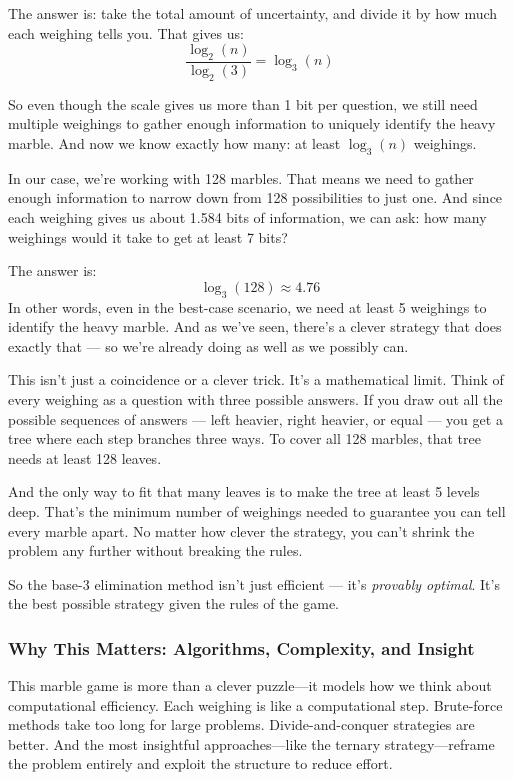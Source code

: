 The answer is: take the total amount of uncertainty, and divide it by how much each weighing tells you. That gives us:
\[
\frac{\log_2(n)}{\log_2(3)} = \log_3(n)
\]

So even though the scale gives us more than 1 bit per question, we still need multiple weighings to gather enough information to uniquely identify the heavy marble. And now we know exactly how many: at least \( \log_3(n) \) weighings.


In our case, we’re working with 128 marbles. That means we need to gather enough information to narrow down from 128 possibilities to just one. And since each weighing gives us about 1.584 bits of information, we can ask: how many weighings would it take to get at least 7 bits?

The answer is:
\[
\log_3(128) \approx 4.76
\]
In other words, even in the best-case scenario, we need at least 5 weighings to identify the heavy marble. And as we’ve seen, there’s a clever strategy that does exactly that — so we’re already doing as well as we possibly can.

This isn’t just a coincidence or a clever trick. It’s a mathematical limit. Think of every weighing as a question with three possible answers. If you draw out all the possible sequences of answers — left heavier, right heavier, or equal — you get a tree where each step branches three ways. To cover all 128 marbles, that tree needs at least 128 leaves.

And the only way to fit that many leaves is to make the tree at least 5 levels deep. That’s the minimum number of weighings needed to guarantee you can tell every marble apart. No matter how clever the strategy, you can’t shrink the problem any further without breaking the rules.

So the base-3 elimination method isn’t just efficient — it’s \textit{provably optimal}. It’s the best possible strategy given the rules of the game.





\subsubsection{Why This Matters: Algorithms, Complexity, and Insight}

This marble game is more than a clever puzzle—it models how we think about computational efficiency. Each weighing is like a computational step. Brute-force methods take too long for large problems. Divide-and-conquer strategies are better. And the most insightful approaches—like the ternary strategy—reframe the problem entirely and exploit the structure to reduce effort.

